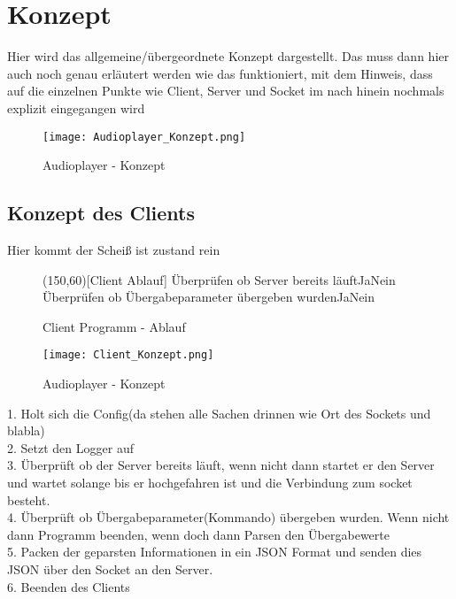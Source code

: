 \section{Konzept}
Hier wird das allgemeine/übergeordnete Konzept dargestellt. Das muss dann hier auch noch genau erläutert werden wie das funktioniert, mit dem Hinweis, dass auf die einzelnen Punkte wie Client, Server und Socket im nach hinein nochmals explizit eingegangen wird
\begin{figure}[h]
	\centering
	\texttt{[image: Audioplayer\_Konzept.png]}
	\caption{Audioplayer - Konzept}
	\label{img:grafik-RaspberryPi3}
\end{figure}
\newline

\subsection{Konzept des Clients}
Hier kommt der Scheiß ist zustand rein

\begin{figure}[ht]
    \begin{struktogramm}(150,60)[Client Ablauf] 
                         {Überprüfen ob Server bereits läuft}{Ja}{Nein} 
                        \assign{}
                        \change
                        \ifend
                         {Überprüfen ob Übergabeparameter übergeben wurden}{Ja}{Nein} 
                        \change
                        \ifend
    \end{struktogramm} 
\caption{Client Programm - Ablauf} 
\label{lst:client_ablauf} 
\end{figure}

\begin{figure}[h]
	\centering
	\texttt{[image: Client\_Konzept.png]}
	\caption{Audioplayer - Konzept}
	\label{img:grafik-RaspberryPi3}
\end{figure}

1. Holt sich die Config(da stehen alle Sachen drinnen wie Ort des Sockets und blabla)\\
2. Setzt den Logger auf \\
3. Überprüft ob der Server bereits läuft, wenn nicht dann startet er den Server und wartet solange bis er hochgefahren ist und die Verbindung zum socket besteht. \\
4. Überprüft ob Übergabeparameter(Kommando) übergeben wurden. Wenn nicht dann Programm beenden, wenn doch dann Parsen den Übergabewerte \\
5. Packen der geparsten Informationen in ein JSON Format und senden dies JSON über den Socket an den Server. \\
6. Beenden des Clients \\

